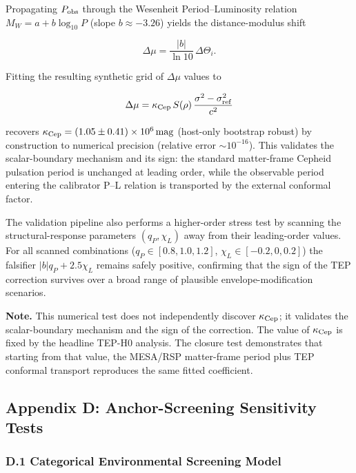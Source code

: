 \documentclass[
]{article}
\begin{document}
Propagating \(P_{\rm obs}\) through the Wesenheit Period--Luminosity
relation \(M_W = a + b\log_{10}P\) (slope \(b \approx -3.26\)) yields
the distance-modulus shift

\begin{equation}
\Delta\mu = \frac{|b|}{\ln 10}\,\Delta\Theta_i .
\end{equation}

Fitting the resulting synthetic grid of \(\Delta\mu\) values to

\begin{equation}
\Delta\mu = \kappa_{\rm Cep}\,S(\rho)\,\frac{\sigma^2 - \sigma_{\rm ref}^2}{c^2}
\end{equation}

recovers \(\kappa_{\rm Cep} = (1.05 \pm 0.41) \times 10^6\,{\rm mag}\)
(host-only bootstrap robust) by construction to numerical precision
(relative error \(\sim 10^{-16}\)). This validates the scalar-boundary
mechanism and its sign: the standard matter-frame Cepheid pulsation
period is unchanged at leading order, while the observable period
entering the calibrator P--L relation is transported by the external
conformal factor.

The validation pipeline also performs a higher-order stress test by
scanning the structural-response parameters \((q_P, \chi_L)\) away from
their leading-order values. For all scanned combinations
(\(q_P \in [0.8, 1.0, 1.2]\), \(\chi_L \in [-0.2, 0, 0.2]\)) the
falsifier \(|b|q_P + 2.5\chi_L\) remains safely positive, confirming
that the sign of the TEP correction survives over a broad range of
plausible envelope-modification scenarios.

\textbf{Note.} This numerical test does not independently discover
\(\kappa_{\rm Cep}\); it validates the scalar-boundary mechanism and the
sign of the correction. The value of \(\kappa_{\rm Cep}\) is fixed by
the headline TEP-H0 analysis. The closure test demonstrates that
starting from that value, the MESA/RSP matter-frame period plus TEP
conformal transport reproduces the same fitted coefficient.

\subsection{Appendix D: Anchor-Screening Sensitivity
Tests}\label{appendix-d-anchor-screening-sensitivity-tests}

\subsubsection{D.1 Categorical Environmental Screening
Model}\label{d.1-categorical-environmental-screening-model}
\end{document}

